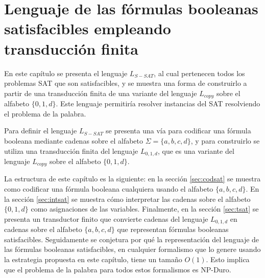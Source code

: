 

\chapter{Lenguaje de las fórmulas booleanas satisfacibles empleando transducción finita}
\label{chap:LSATFT}


En este capítulo se presenta el lenguaje $L_{S-SAT}$, al cual pertenecen todos los problemas SAT que son 
satisfacibles, y se muestra una forma de construirlo a partir de una transducción finita de una variante 
del lenguaje $L_{copy}$ sobre el alfabeto $\{0,1,d\}$. Este lenguaje permitiría resolver instancias del SAT resolviendo el problema de la palabra.  

Para definir el lenguaje $L_{S-SAT}$ se presenta una vía para codificar una fórmula booleana mediante cadenas sobre el alfabeto $\Sigma=\{a, b,c,d\}$, y para construirlo se utiliza una transducción finita del lenguaje $L_{0,1,d}$, que es una variante del lenguaje $L_{copy}$ sobre el alfabeto $\{0,1,d\}$.

La estructura de este capítulo es la siguiente: en la sección \ref{sec:codsat} se muestra como codificar una fórmula booleana cualquiera usando el alfabeto $\{a,b,c,d\}$. En la sección \ref{sec:intsat} se muestra cómo interpretar las cadenas sobre el alfabeto $\{0,1,d\}$ como asignaciones de las variables. Finalmente, en la sección \ref{sec:tsat} se presenta un transductor finito que convierte cadenas del lenguaje $L_{0,1,d}$ en cadenas sobre el alfabeto $\{a,b,c,d\}$ que representan fórmulas booleanas satisfacibles. Seguidamente se conjetura por qué la representación del lenguaje de las fórmulas booleanas satisfacibles, en cualquier formalismo que lo genere usando la estrategia propuesta en este capítulo, tiene un tamaño $O(1)$. Esto implica que el problema de la palabra para todos estos formalismos es NP-Duro.


